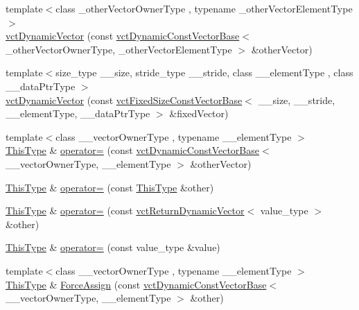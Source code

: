 \begin{DoxyCompactItemize}
\item 
{\footnotesize template$<$class \-\_\-other\-Vector\-Owner\-Type , typename \-\_\-other\-Vector\-Element\-Type $>$ }\\\hyperlink{classvct_dynamic_vector_a0ac208d49e93ac6a58c66be51123711c}{vct\-Dynamic\-Vector} (const \hyperlink{classvct_dynamic_const_vector_base}{vct\-Dynamic\-Const\-Vector\-Base}$<$ \-\_\-other\-Vector\-Owner\-Type, \-\_\-other\-Vector\-Element\-Type $>$ \&other\-Vector)
\item 
{\footnotesize template$<$size\-\_\-type \-\_\-\-\_\-size, stride\-\_\-type \-\_\-\-\_\-stride, class \-\_\-\-\_\-element\-Type , class \-\_\-\-\_\-data\-Ptr\-Type $>$ }\\\hyperlink{classvct_dynamic_vector_ac69e9fe1929ddeacc2366ec99a60ed06}{vct\-Dynamic\-Vector} (const \hyperlink{classvct_fixed_size_const_vector_base}{vct\-Fixed\-Size\-Const\-Vector\-Base}$<$ \-\_\-\-\_\-size, \-\_\-\-\_\-stride, \-\_\-\-\_\-element\-Type, \-\_\-\-\_\-data\-Ptr\-Type $>$ \&fixed\-Vector)
\item 
{\footnotesize template$<$class \-\_\-\-\_\-vector\-Owner\-Type , typename \-\_\-\-\_\-element\-Type $>$ }\\\hyperlink{classvct_dynamic_const_vector_base_a39da273523717f678f54d3321ebca3dd}{This\-Type} \& \hyperlink{classvct_dynamic_vector_aa7275eb4c8453bec0358bab942e4d20f}{operator=} (const \hyperlink{classvct_dynamic_const_vector_base}{vct\-Dynamic\-Const\-Vector\-Base}$<$ \-\_\-\-\_\-vector\-Owner\-Type, \-\_\-\-\_\-element\-Type $>$ \&other\-Vector)
\item 
\hyperlink{classvct_dynamic_const_vector_base_a39da273523717f678f54d3321ebca3dd}{This\-Type} \& \hyperlink{classvct_dynamic_vector_a64bfe8d3fa623848a4cd42a66d747037}{operator=} (const \hyperlink{classvct_dynamic_const_vector_base_a39da273523717f678f54d3321ebca3dd}{This\-Type} \&other)
\item 
\hyperlink{classvct_dynamic_const_vector_base_a39da273523717f678f54d3321ebca3dd}{This\-Type} \& \hyperlink{classvct_dynamic_vector_a76be8aa85264ea353998537ab80c17ce}{operator=} (const \hyperlink{classvct_return_dynamic_vector}{vct\-Return\-Dynamic\-Vector}$<$ value\-\_\-type $>$ \&other)
\item 
\hyperlink{classvct_dynamic_const_vector_base_a39da273523717f678f54d3321ebca3dd}{This\-Type} \& \hyperlink{classvct_dynamic_vector_a0b2769b4d636aeb65db364995f69550c}{operator=} (const value\-\_\-type \&value)
\item 
{\footnotesize template$<$class \-\_\-\-\_\-vector\-Owner\-Type , typename \-\_\-\-\_\-element\-Type $>$ }\\\hyperlink{classvct_dynamic_const_vector_base_a39da273523717f678f54d3321ebca3dd}{This\-Type} \& \hyperlink{classvct_dynamic_vector_a0dadd9f4a34f6c698597c46c101c3e10}{Force\-Assign} (const \hyperlink{classvct_dynamic_const_vector_base}{vct\-Dynamic\-Const\-Vector\-Base}$<$ \-\_\-\-\_\-vector\-Owner\-Type, \-\_\-\-\_\-element\-Type $>$ \&other)

\end{DoxyCompactItemize}
